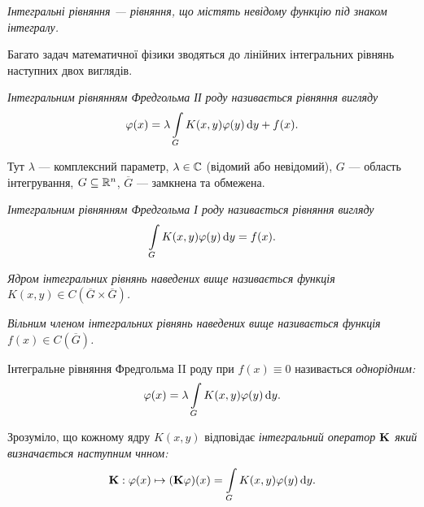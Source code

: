 \begin{definition}
	\it{Інтегральні рівняння} --- рівняння, що містять невідому функцію під знаком інтегралу.
\end{definition}

Багато задач математичної фізики зводяться до лінійних інтегральних рівнянь наступних двох виглядів.

\begin{definition}
	\it{Інтегральним рівнянням Фредгольма ІІ роду} називається рівняння вигляду
	\begin{equation}
		\phi(x) = \lambda \Int_G K(x, y) \phi(y) \diff y + f(x).
	\end{equation}
\end{definition}

Тут $\lambda$ --- комплексний параметр, $\lambda \in \CC$ (відомий або невідомий), $G$ --- область інтегрування, $G \subseteq \RR^n$, $\overline G$ --- замкнена та обмежена.

\begin{definition}
	\it{Інтегральним рівнянням Фредгольма І роду} називається рівняння вигляду
	\begin{equation}
		\Int_G K(x, y) \phi(y) \diff y = f(x).
	\end{equation}
\end{definition}

\begin{definition}
	\it{Ядром} інтегральних рівнянь наведених вище називається функція $K(x, y) \in C\left(\overline G\times\overline G\right)$.
\end{definition}

\begin{definition}
	\it{Вільним \allowbreak членом} інтегральних рівнянь наведених вище називається функція $f(x) \in C\left(\overline G\right)$.
\end{definition}

\begin{definition}
	Інтегра\-льне рівняння Фредгольма II роду при $f(x) \equiv 0$ називається \it{однорідним}:
	\begin{equation}
		\phi(x) = \lambda \Int_G K(x, y) \phi(y) \diff y.
	\end{equation}
\end{definition}

\begin{definition}
	Зрозуміло, що кожному ядру $K(x, y)$ відповідає \it{інтегральний оператор} $\bf{K}$ який визначається наступним чнном:
	\begin{equation}
		\bf{K}: \phi(x) \mapsto (\bf{K} \phi)(x) = \Int_G K(x, y) \phi(y) \diff y.
	\end{equation}
\end{definition}

